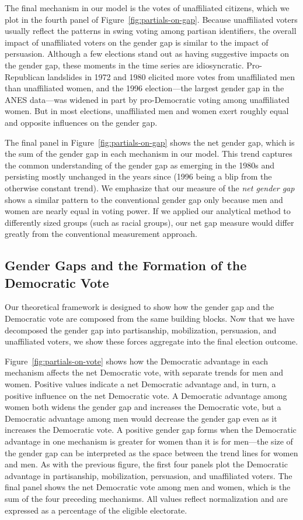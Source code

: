 \documentclass[12pt
               ,final
               ]{article}
\begin{document}
The final mechanism in our model is the votes of unaffiliated citizens, which we plot in the fourth panel of Figure~\ref{fig:partials-on-gap}. Because unaffiliated voters usually reflect the patterns in swing voting among partisan identifiers, the overall impact of unaffiliated voters on the gender gap is similar to the impact of persuasion. Although a few elections stand out as having suggestive impacts on the gender gap, these moments in the time series are idiosyncratic. Pro-Republican landslides in 1972 and 1980 elicited more votes from unaffiliated men than unaffiliated women, and the 1996 election---the largest gender gap in the ANES data---was widened in part by pro-Democratic voting among unaffiliated women. But in most elections, unaffiliated men and women exert roughly equal and opposite influences on the gender gap. 

The final panel in Figure~\ref{fig:partials-on-gap} shows the net gender gap, which is the sum of the gender gap in each mechanism in our model. This trend captures the common understanding of the gender gap as emerging in the 1980s and persisting mostly unchanged in the years since (1996 being a blip from the otherwise constant trend). We emphasize that our measure of the \emph{net gender gap} shows a similar pattern to the conventional gender gap only because men and women are nearly equal in voting power. If we applied our analytical method to differently sized groups (such as racial groups), our net gap measure would differ greatly from the conventional measurement approach.




\subsection*{Gender Gaps and the Formation of the Democratic Vote}

Our theoretical framework is designed to show how the gender gap and the Democratic vote are composed from the same building blocks. Now that we have decomposed the gender gap into partisanship, mobilization, persuasion, and unaffiliated voters, we show these forces aggregate into the final election outcome.

Figure~\ref{fig:partials-on-vote} shows how the Democratic advantage in each mechanism affects the net Democratic vote, with separate trends for men and women. Positive values indicate a net Democratic advantage and, in turn, a positive influence on the net Democratic vote. A Democratic advantage among women both widens the gender gap and increases the Democratic vote, but a Democratic advantage among men would decrease the gender gap even as it increases the Democratic vote. A positive gender gap forms when the Democratic advantage in one mechanism is greater for women than it is for men---the size of the gender gap can be interpreted as the space between the trend lines for women and men. As with the previous figure, the first four panels plot the Democratic advantage in partisanship, mobilization, persuasion, and unaffiliated voters. The final panel shows the net Democratic vote among men and women, which is the sum of the four preceding mechanisms. All values reflect normalization and are expressed as a percentage of the eligible electorate. 
\end{document}
